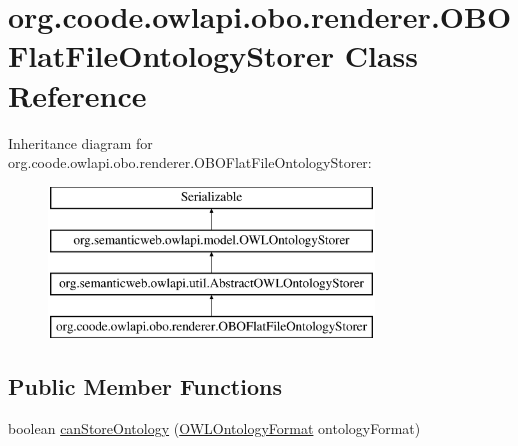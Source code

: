 \hypertarget{classorg_1_1coode_1_1owlapi_1_1obo_1_1renderer_1_1_o_b_o_flat_file_ontology_storer}{\section{org.\-coode.\-owlapi.\-obo.\-renderer.\-O\-B\-O\-Flat\-File\-Ontology\-Storer Class Reference}
\label{classorg_1_1coode_1_1owlapi_1_1obo_1_1renderer_1_1_o_b_o_flat_file_ontology_storer}
}
Inheritance diagram for org.\-coode.\-owlapi.\-obo.\-renderer.\-O\-B\-O\-Flat\-File\-Ontology\-Storer\-:\begin{figure}[H]
\begin{center}
\leavevmode
\includegraphics[height=4.000000cm]{classorg_1_1coode_1_1owlapi_1_1obo_1_1renderer_1_1_o_b_o_flat_file_ontology_storer}
\end{center}
\end{figure}
\subsection*{Public Member Functions}
\begin{DoxyCompactItemize}
\item 
boolean \hyperlink{classorg_1_1coode_1_1owlapi_1_1obo_1_1renderer_1_1_o_b_o_flat_file_ontology_storer_a419cdc544ab0e7c1cf895deaa33a420f}{can\-Store\-Ontology} (\hyperlink{classorg_1_1semanticweb_1_1owlapi_1_1model_1_1_o_w_l_ontology_format}{O\-W\-L\-Ontology\-Format} ontology\-Format)
\end{DoxyCompactItemize}
